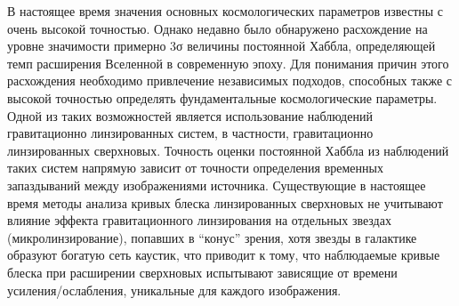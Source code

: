 В настоящее время значения основных космологических параметров известны с очень высокой точностью. Однако недавно было обнаружено расхождение на уровне значимости примерно 3σ величины постоянной Хаббла, определяющей темп расширения Вселенной в современную эпоху. Для понимания причин этого расхождения необходимо привлечение независимых подходов, способных также с высокой точностью определять фундаментальные космологические параметры. Одной из таких возможностей является использование наблюдений гравитационно линзированных систем, в частности, гравитационно линзированных сверхновых. Точность оценки постоянной Хаббла из наблюдений таких систем напрямую зависит от точности определения временных запаздываний между изображениями источника. Существующие в настоящее время методы анализа кривых блеска линзированных сверхновых не учитывают влияние эффекта гравитационного линзирования на отдельных звездах (микролинзирование), попавших в “конус” зрения, хотя звезды в галактике образуют богатую сеть каустик, что приводит к тому, что наблюдаемые кривые блеска при расширении сверхновых испытывают зависящие от времени усиления/ослабления, уникальные для каждого изображения.
